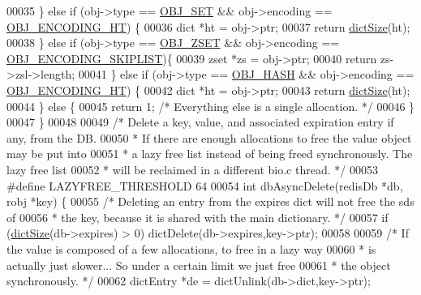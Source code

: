 \begin{DoxyCode}
00035     \} \textcolor{keywordflow}{else} \textcolor{keywordflow}{if} (obj->type == \hyperlink{server_8h_a8d179375a4aac33d3fa7aa80c8ccc75f}{OBJ\_SET} && obj->encoding == 
      \hyperlink{server_8h_a9c10219f68afc557d510d108257d238b}{OBJ\_ENCODING\_HT}) \{
00036         dict *ht = obj->ptr;
00037         \textcolor{keywordflow}{return} \hyperlink{dict_8h_af193430dd3d5579a52b194512f72c1f0}{dictSize}(ht);
00038     \} \textcolor{keywordflow}{else} \textcolor{keywordflow}{if} (obj->type == \hyperlink{server_8h_a8c356422ddbc03bd77694880a30a1953}{OBJ\_ZSET} && obj->encoding == 
      \hyperlink{server_8h_acfb35db5cb30ed113ed23aeb1a224c4c}{OBJ\_ENCODING\_SKIPLIST})\{
00039         zset *zs = obj->ptr;
00040         \textcolor{keywordflow}{return} zs->zsl->length;
00041     \} \textcolor{keywordflow}{else} \textcolor{keywordflow}{if} (obj->type == \hyperlink{server_8h_a87c05ba4f7f36741864277f02a4423fb}{OBJ\_HASH} && obj->encoding == 
      \hyperlink{server_8h_a9c10219f68afc557d510d108257d238b}{OBJ\_ENCODING\_HT}) \{
00042         dict *ht = obj->ptr;
00043         \textcolor{keywordflow}{return} \hyperlink{dict_8h_af193430dd3d5579a52b194512f72c1f0}{dictSize}(ht);
00044     \} \textcolor{keywordflow}{else} \{
00045         \textcolor{keywordflow}{return} 1; \textcolor{comment}{/* Everything else is a single allocation. */}
00046     \}
00047 \}
00048 
00049 \textcolor{comment}{/* Delete a key, value, and associated expiration entry if any, from the DB.}
00050 \textcolor{comment}{ * If there are enough allocations to free the value object may be put into}
00051 \textcolor{comment}{ * a lazy free list instead of being freed synchronously. The lazy free list}
00052 \textcolor{comment}{ * will be reclaimed in a different bio.c thread. */}
00053 \textcolor{preprocessor}{#}\textcolor{preprocessor}{define} \textcolor{preprocessor}{LAZYFREE\_THRESHOLD} 64
00054 \textcolor{keywordtype}{int} dbAsyncDelete(redisDb *db, robj *key) \{
00055     \textcolor{comment}{/* Deleting an entry from the expires dict will not free the sds of}
00056 \textcolor{comment}{     * the key, because it is shared with the main dictionary. */}
00057     \textcolor{keywordflow}{if} (\hyperlink{dict_8h_af193430dd3d5579a52b194512f72c1f0}{dictSize}(db->expires) > 0) dictDelete(db->expires,key->ptr);
00058 
00059     \textcolor{comment}{/* If the value is composed of a few allocations, to free in a lazy way}
00060 \textcolor{comment}{     * is actually just slower... So under a certain limit we just free}
00061 \textcolor{comment}{     * the object synchronously. */}
00062     dictEntry *de = dictUnlink(db->dict,key->ptr);

\end{DoxyCode}

